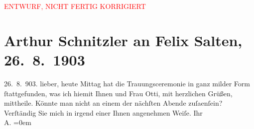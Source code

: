 
\begin{center}
            \textcolor{red}{ENTWURF, NICHT FERTIG KORRIGIERT}
                      \end{center}
            
         
         \renewcommand{\erwaehntePersonen}{Personen: Felix Salten, Ottilie Salten}
         \renewcommand{\erwaehnteOrte}{Orte: Wien}
         \renewcommand{\erwaehnteWerke}{}
               \section[Arthur Schnitzler an Felix Salten, 26. 8. 1903]{ Arthur Schnitzler an Felix Salten, 26. 8. 1903}\nopagebreak{}\rehead{ }\begin{ledgroupsized}[t]{13cm}\normalsize\beginnumbering \toendnotes[C]{\smallbreak\pagebreak[2]} 
\pstart
           \raggedleft{}{\pb}26. 8. 903.\pend
           \pstart
           lieber, heute Mittag hat die Trauungsceremonie in ganz milder Form
               ſtattgefunden, was ich hiemit Ihnen und Frau Otti, mit herzlichen Grüßen, mittheile. \pend
           \pstart
           {\pb}Könnte man nicht an einem der nächſten
               Abende zuſa{\geminationm}enſein? Verſtändig Sie mich in irgend einer
               Ihnen angenehmen Weiſe. \pend
           \pstart
           Ihr {\\[\baselineskip]}\spacefill\mbox{A.}\pend
           \leftskip=0em{}
         
         \endnumbering{}\end{ledgroupsized}\begin{anhang}\end{anhang}\newcommand{\dateiname}{L02983}\newcommand{\titel}{Arthur Schnitzler an Felix Salten, 26. 8. 1903}\newcommand{\editorInnen}{Martin Anton Müller und Laura Untner}
      